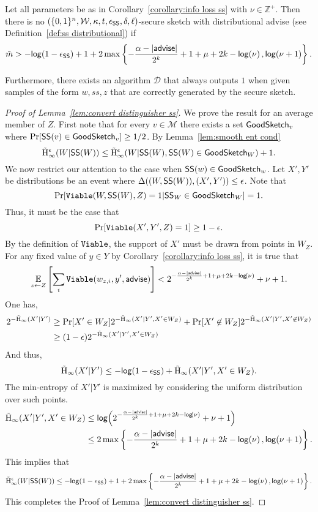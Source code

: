 \begin{lemma}
\label{lem:convert distinguisher ss}
Let all parameters be as in Corollary~\ref{corollary:info loss ss} with $\nu \in\mathbb{Z}^+$.  Then there is no $(\{0,1\}^n, \mathcal{W}, \kappa, t, \epsilon_{\mathsf{SS}}, \delta, \ell)$-secure sketch with distributional advise (see Definition~\ref{def:ss distributional}) if
\[
\tilde{m}> -\mathsf{log}\!\left(1-\epsilon_{\mathsf{SS}}\right) +1 + 2\max\left\{-\frac{\alpha-|{\mathsf{advise}}|}{2^k}+1+\mu+2k-\mathsf{log}\!\left(\nu\right), \mathsf{log}\!\left(\nu+1\right)\right\}.
\]

Furthermore, there exists an algorithm $\mathcal{D}$ that always outputs $1$ when given samples of the form $w, ss, z$ that are correctly generated by the secure sketch.
\end{lemma}
\begin{proof}[Proof of Lemma~\ref{lem:convert distinguisher ss}]
We prove the result for an average member of $Z$.  First note that for every $v\in \mathcal{M}$ there exists a set $\mathsf{GoodSketch}_v$ where $\Pr[{\mathsf{SS}}(v)\in \mathsf{GoodSketch}_v] \ge 1/2$.  By Lemma~\ref{lem:smooth ent cond}
\[
\tilde{\mathrm{H}}_\infty^\epsilon(W| {\mathsf{SS}}(W)) \le \tilde{\mathrm{H}}_\infty^\epsilon(W| {\mathsf{SS}}(W), {\mathsf{SS}}(W)\in \mathsf{GoodSketch}_W) +1.
\]
We now restrict our attention to the case when ${\mathsf{SS}}(w) \in \mathsf{GoodSketch}_w$.   
Let $X', Y'$ be distributions  be an event where $\Delta((W, {\mathsf{SS}}(W)), (X', Y'))\le \epsilon$. Note that 
\[
\Pr[\mathtt{Viable}(W, {\mathsf{SS}}(W), Z) = 1| {\mathsf{SS}}_W \in \mathsf{GoodSketch}_W] = 1.
\]
Thus, it must be the case that 
\[
\Pr[\mathtt{Viable}(X', Y', Z) = 1] \ge 1-\epsilon.
\]
By the definition of $\mathtt{Viable}$, the support of $X'$ must be drawn from points in $W_Z$.  For any fixed value of $y\in Y$ by Corollary~\ref{corollary:info loss ss}, it is true that 
\begin{align*}
\operatorname*{\mathbb{E}}_{z\leftarrow Z} \left[\sum_{i }  \mathtt{Viable}(w_{z,i}, y', {\mathsf{advise}})  \right]< 2^{-\frac{\alpha-|{\mathsf{advise}}|}{2^k}+1+\mu+2k-\mathsf{log}\!\left(\nu\right)}+\nu+1.
\end{align*}
One has, 
\begin{align*}
2^{-\tilde{\mathrm{H}}_\infty(X'|Y')} &\ge  \Pr[X' \in W_Z] 2^{-\tilde{\mathrm{H}}_\infty(X'|Y', X'\in W_Z) }+ \Pr[X'\not\in W_Z] 2^{-\tilde{\mathrm{H}}_\infty(X'|Y', X'\not\in W_Z)}\\
 &\ge  (1-\epsilon)2^{-\tilde{\mathrm{H}}_\infty(X'|Y', X'\in W_Z) }
\end{align*}
And thus, 
\[
\tilde{\mathrm{H}}_\infty(X'|Y') \le  -\mathsf{log}\!\left(1-\epsilon_{\mathsf{SS}}\right) +\tilde{\mathrm{H}}_\infty(X'|Y', X'\in W_Z).
\]
The min-entropy of $X' |Y'$ is maximized by considering the uniform distribution over such points. \begin{align*}
\tilde{\mathrm{H}}_\infty(X'|Y' , X'\in W_Z) &\le \mathsf{log}\!\left(2^{-\frac{\alpha-|{\mathsf{advise}}|}{2^k}+1+\mu+2k-\mathsf{log}\!\left(\nu\right)}+\nu+1\right)\\
&\le 2\max\left\{-\frac{\alpha-|{\mathsf{advise}}|}{2^k}+1+\mu+2k-\mathsf{log}\!\left(\nu\right), \mathsf{log}\!\left(\nu+1\right)\right\}.
\end{align*}
This implies that 
\[
\tilde{\mathrm{H}}_\infty^\epsilon(W| {\mathsf{SS}}(W)) \le -\mathsf{log}\!\left(1-\epsilon_{\mathsf{SS}}\right) +1 + 2\max\left\{-\frac{\alpha-|{\mathsf{advise}}|}{2^k}+1+\mu+2k-\mathsf{log}\!\left(\nu\right), \mathsf{log}\!\left(\nu+1\right)\right\}.
\]
This completes the Proof of Lemma~\ref{lem:convert distinguisher ss}.
\end{proof}


